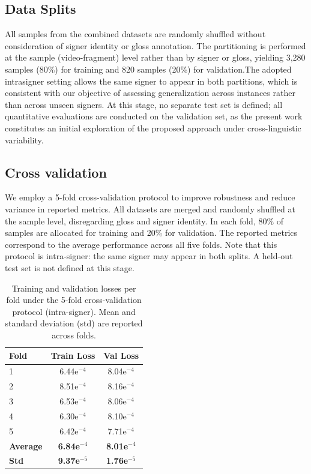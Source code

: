 \documentclass[runningheads]{llncs}
\begin{document}
\subsection{Data Splits}\label{sec:data-splits}
All samples from the combined datasets are randomly shuffled without consideration of signer identity or gloss annotation. The partitioning is performed at the sample (video-fragment) level rather than by signer or gloss, yielding 3,280 samples (80\%) for training and 820 samples (20\%) for validation.The adopted intrasigner setting allows the same signer to appear in both partitions, which is consistent with our objective of assessing generalization across instances rather than across unseen signers. At this stage, no separate test set is defined; all quantitative evaluations are conducted on the validation set, as the present work constitutes an initial exploration of the proposed approach under cross-linguistic variability.

\subsection{Cross validation}
\label{sec:cross-validation}
We employ a 5-fold cross-validation protocol to improve robustness and reduce variance in reported metrics. All datasets are merged and randomly shuffled at the sample level, disregarding gloss and signer identity. In each fold, 80\% of samples are allocated for training and 20\% for validation. The reported metrics correspond to the average performance across all five folds. Note that this protocol is intra-signer: the same signer may appear in both splits. A held-out test set is not defined at this stage.

\begin{table}[H]
\centering
\caption{Training and validation losses per fold under the 5-fold cross-validation protocol (intra-signer). Mean and standard deviation (std) are reported across folds.}
\label{tab:cv-loss}
\setlength{\tabcolsep}{8pt}
\begin{tabular}{lcc}
\hline
\textbf{Fold} & \textbf{Train Loss} & \textbf{Val Loss} \\
\hline
1 & 6.44e$^{-4}$ & 8.04e$^{-4}$ \\
2 & 8.51e$^{-4}$ & 8.16e$^{-4}$ \\
3 & 6.53e$^{-4}$ & 8.06e$^{-4}$ \\
4 & 6.30e$^{-4}$ & 8.10e$^{-4}$ \\
5 & 6.42e$^{-4}$ & 7.71e$^{-4}$ \\
\hline
\textbf{Average} & \textbf{6.84e$^{-4}$} & \textbf{8.01e$^{-4}$} \\
\textbf{Std} & \textbf{9.37e$^{-5}$} & \textbf{1.76e$^{-5}$} \\
\hline
\end{tabular}
\end{table}
\end{document}
